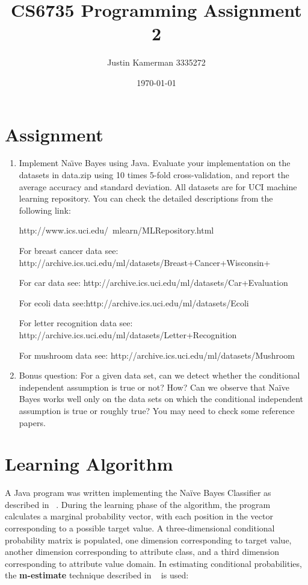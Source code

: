 \documentclass[10pt]{report}
\title{CS6735 Programming Assignment 2}
\author{Justin Kamerman 3335272}
\date{\today}
\begin{document}
\maketitle
\renewcommand*\thesection{\arabic{section}}

\section{Assignment}
\begin{enumerate} 
\item Implement Na\"{\i}ve Bayes using Java. Evaluate your implementation
  on the datasets in data.zip using 10 times 5-fold cross-validation,
  and report the average accuracy and standard deviation. All datasets
  are for UCI machine learning repository. You can check the detailed
  descriptions from the following link: 
 
http://www.ics.uci.edu/~mlearn/MLRepository.html

For breast cancer data see:
http://archive.ics.uci.edu/ml/datasets/Breast+Cancer+Wisconsin+%

For car data see:
http://archive.ics.uci.edu/ml/datasets/Car+Evaluation

For ecoli data see:http://archive.ics.uci.edu/ml/datasets/Ecoli

For letter recognition data see:
http://archive.ics.uci.edu/ml/datasets/Letter+Recognition

For mushroom data see: http://archive.ics.uci.edu/ml/datasets/Mushroom

\item Bonus question: For a given data set, can we detect whether the
  conditional independent assumption is true or not? How? Can we
  observe that Na\"{i}ve Bayes works well only on the data sets on which
  the conditional independent assumption is true or roughly true? You
  may need to check some reference papers. 
\end{enumerate}

\section{Learning Algorithm}
\label{sec:learningalgorithm}

A Java program was written implementing the Na\"{i}ve Bayes Classifier as
described in ~\cite{Mitchell1997}. During the learning phase of the
algorithm, the program calculates a marginal probability vector, with
each position in the vector corresponding to a possible target
value. A three-dimensional conditional probability matrix is
populated, one dimension corresponding to target value, another
dimension corresponding to attribute class, and a third dimension
corresponding to attribute value domain. In estimating conditional
probabilities, the \textbf{m-estimate} technique described in
~\cite{Mitchell1997} is used:
\end{document}
